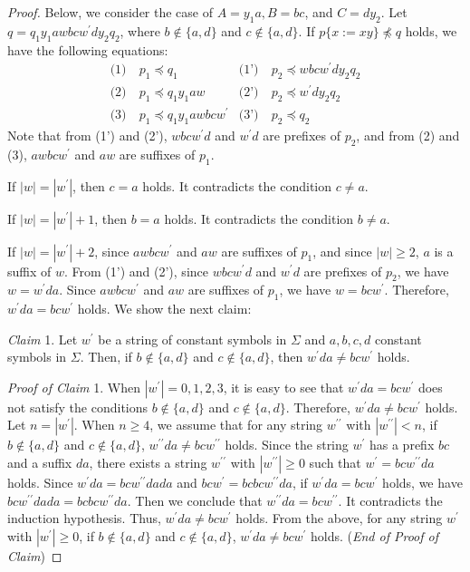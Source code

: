 \begin{proof}
  Below, we consider the case of $A=y_{1}a,B=bc$, and $C=dy_{2}$.
  Let $q=q_{1}y_{1}awbcw^{\prime}dy_{2}q_{2}$, where $b \not\in \{a,d\}$ and $c \not\in \{a,d\}$.
  If $p \{ x := xy \} \not \preceq q$ holds, we have the following equations:
  \begin{align*}
    \textrm{(1)}~& p_{1} \preceq q_{1} & \textrm{(1')}~& p_{2} \preceq wbcw^{\prime}dy_{2}q_{2} \\
    \textrm{(2)}~& p_{1} \preceq q_{1}y_{1}aw & \textrm{(2')}~& p_{2} \preceq w^{\prime}dy_{2}q_{2} \\
    \textrm{(3)}~& p_{1} \preceq q_{1}y_{1}awbcw^{\prime} & \textrm{(3')}~& p_{2} \preceq q_{2}
  \end{align*}
  Note that from (1') and (2'), $wbcw^{\prime}d$ and $w^{\prime}d$ are prefixes of $p_{2}$, and from (2) and (3), $awbcw^{\prime}$ and $aw$ are suffixes of $p_{1}$.

  If $|w|=|w^{\prime}|$, then $c=a$ holds.
  It contradicts the condition $c \not = a$.
  
  If $|w|=|w^{\prime}|+1$, then $b = a$ holds.
  It contradicts the condition $b \not = a$.
  
  If $|w| = |w^{\prime}|+2$, since $awbcw^{\prime}$ and $aw$ are suffixes of $p_{1}$, and since $|w|\geq 2$, $a$ is a suffix of $w$.
  From (1') and (2'), since $wbcw^{\prime}d$ and $w^{\prime}d$ are prefixes of $p_{2}$, we have $w=w^{\prime}da$.
  Since $awbcw^{\prime}$ and $aw$ are suffixes of $p_{1}$, we have $w=bcw^{\prime}$.
  Therefore, $w^{\prime}da = bcw^{\prime}$ holds. We show the next claim:

  \smallskip

  \noindent
  \textit{Claim} 1.
  Let $w^{\prime}$ be a string of constant symbols in $\Sigma$ and $a,b,c,d$ constant symbols in $\Sigma$.
  Then, if $b \not\in \{a,d\}$ and $c \not\in \{a,d\}$, then $w^{\prime}da \not = bcw^{\prime}$ holds.

  \smallskip
  
  \noindent
  \textit{Proof of Claim} 1.
  When $|w^{\prime}| = 0, 1, 2, 3$, it is easy to see that $w^{\prime}da=bcw^{\prime}$ does not satisfy the conditions $b \not\in \{a,d\}$ and $c \not\in \{a,d\}$. Therefore, $w^{\prime}da \not= bcw^{\prime}$ holds.
  Let $n = |w^{\prime}|$.
  When $n \ge 4$, we assume that for any string $w^{\prime\prime}$ with $|w^{\prime\prime}|<n$, if $b \not\in \{a,d\}$ and $c \not\in \{a,d\}$, $w^{\prime\prime}da \not =bcw^{\prime\prime}$ holds.
  Since the string $w^{\prime}$ has a prefix $bc$ and a suffix $da$, there exists a string $w^{\prime\prime}$ with $|w^{\prime\prime}| \geq 0$ such that $w^{\prime}=bcw^{\prime\prime}da$ holds.
  Since $w^{\prime}da=bcw^{\prime\prime}dada$ and $bcw^{\prime}=bcbcw^{\prime\prime}da$, if $w^{\prime}da = bcw^{\prime}$ holds, we have $bcw^{\prime\prime}dada=bcbcw^{\prime\prime}da$.
  Then we conclude that $w^{\prime\prime}da=bcw^{\prime\prime}$.
  It contradicts the induction hypothesis. Thus, $w^{\prime}da \not= bcw^{\prime}$ holds.
  From the above, for any string $w^{\prime}$ with $|w^{\prime}| \geq 0$, if $b \not\in \{a,d\}$ and $c \not\in \{a,d\}$, $w^{\prime}da \not =bcw^{\prime}$ holds.
  (\textit{End of Proof of Claim})
  

\end{proof}

